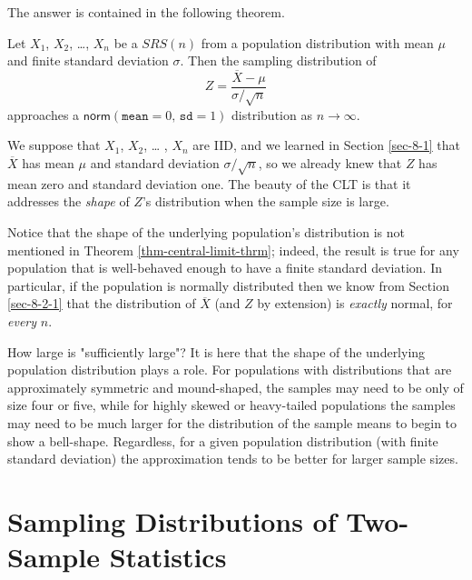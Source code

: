 The answer is contained in the following theorem.

\begin{thm}
\label{thm-central-limit-thrm} Let \(X_{1}\), \(X_{2}\), \ldots{}, \(X_{n}\) be
a \(SRS(n)\) from a population distribution with mean \(\mu\) and
finite standard deviation \(\sigma\). Then the sampling distribution
of
\begin{equation}
Z=\frac{\overline{X}-\mu}{\sigma/\sqrt{n}}
\end{equation}
approaches a \(\mathsf{norm}(\mathtt{mean}=0,\,\mathtt{sd}=1)\) distribution as \(n\to\infty\).
\end{thm}

\begin{rem}
We suppose that \(X_{1}\), \(X_{2}\), \ldots{} , \(X_{n}\) are IID, and we
learned in Section \ref{sec-8-1} that \(\overline{X}\) has
mean \(\mu\) and standard deviation \(\sigma/\sqrt{n}\), so we already
knew that \(Z\) has mean zero and standard deviation one. The beauty
of the CLT is that it addresses the \emph{shape} of \(Z\)'s distribution
when the sample size is large.
\end{rem}

\begin{rem}
Notice that the shape of the underlying population's distribution is
not mentioned in Theorem \ref{thm-central-limit-thrm}; indeed, the result is true for any
population that is well-behaved enough to have a finite standard
deviation. In particular, if the population is normally distributed
then we know from Section \ref{sec-8-2-1} that the distribution
of \(\overline{X}\) (and \(Z\) by extension) is \emph{exactly} normal, for
\emph{every} \(n\).
\end{rem}

\begin{rem}
How large is "sufficiently large"? It is here that the shape of the
underlying population distribution plays a role. For populations with
distributions that are approximately symmetric and mound-shaped, the
samples may need to be only of size four or five, while for highly
skewed or heavy-tailed populations the samples may need to be much
larger for the distribution of the sample means to begin to show a
bell-shape. Regardless, for a given population distribution (with
finite standard deviation) the approximation tends to be better for
larger sample sizes.
\end{rem}

\section{Sampling Distributions of Two-Sample Statistics}
\label{sec-8-4}

